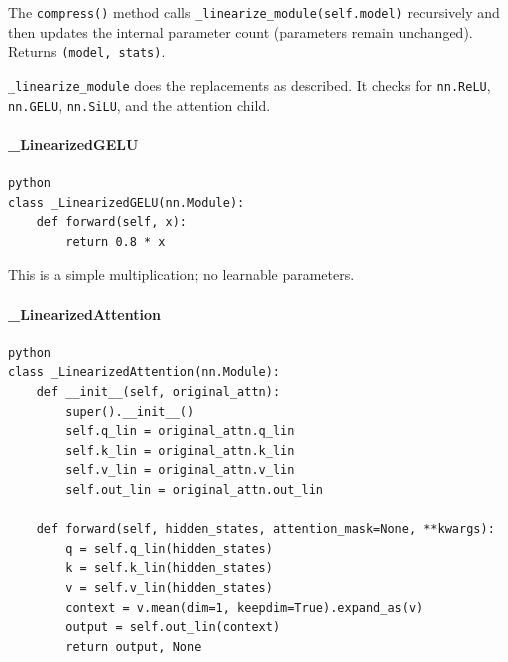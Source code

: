 The \texttt{compress()} method calls \texttt{\_linearize\_module(self.model)} recursively and then updates the internal parameter count (parameters remain unchanged). Returns \texttt{(model, stats)}.

\texttt{\_linearize\_module} does the replacements as described. It checks for \texttt{nn.ReLU}, \texttt{nn.GELU}, \texttt{nn.SiLU}, and the attention child.

\paragraph{\_LinearizedGELU}

\vspace{0.5em}
\begin{mdframed}[backgroundcolor=codebg, linecolor=codeframe, linewidth=1pt, roundcorner=4pt, innerleftmargin=2pt, innerrightmargin=5pt, innertopmargin=5pt, innerbottommargin=5pt]
\begin{lstlisting}
python
class _LinearizedGELU(nn.Module):
    def forward(self, x):
        return 0.8 * x
\end{lstlisting}
\end{mdframed}
\vspace{0.5em}

This is a simple multiplication; no learnable parameters.

\paragraph{\_LinearizedAttention}

\vspace{0.5em}
\begin{mdframed}[backgroundcolor=codebg, linecolor=codeframe, linewidth=1pt, roundcorner=4pt, innerleftmargin=2pt, innerrightmargin=5pt, innertopmargin=5pt, innerbottommargin=5pt]
\begin{lstlisting}
python
class _LinearizedAttention(nn.Module):
    def __init__(self, original_attn):
        super().__init__()
        self.q_lin = original_attn.q_lin
        self.k_lin = original_attn.k_lin
        self.v_lin = original_attn.v_lin
        self.out_lin = original_attn.out_lin

    def forward(self, hidden_states, attention_mask=None, **kwargs):
        q = self.q_lin(hidden_states)
        k = self.k_lin(hidden_states)
        v = self.v_lin(hidden_states)
        context = v.mean(dim=1, keepdim=True).expand_as(v)
        output = self.out_lin(context)
        return output, None
\end{lstlisting}
\end{mdframed}
\vspace{0.5em}

